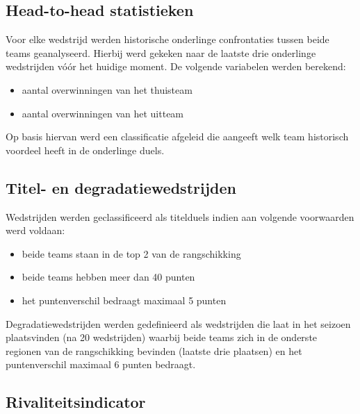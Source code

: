 \vspace{5pt}

\subsection{Head-to-head statistieken}

Voor elke wedstrijd werden historische onderlinge confrontaties tussen beide teams geanalyseerd. 
Hierbij werd gekeken naar de laatste drie onderlinge wedstrijden vóór het huidige moment. De volgende variabelen werden berekend:

\begin{itemize}
    \item aantal overwinningen van het thuisteam
    \item aantal overwinningen van het uitteam
\end{itemize}

Op basis hiervan werd een classificatie afgeleid die aangeeft welk team historisch voordeel heeft in de onderlinge duels.

\vspace{5pt}

\subsection{Titel- en degradatiewedstrijden}

Wedstrijden werden geclassificeerd als titelduels indien aan volgende voorwaarden werd voldaan:
\begin{itemize}
    \item beide teams staan in de top 2 van de rangschikking
    \item beide teams hebben meer dan 40 punten
    \item het puntenverschil bedraagt maximaal 5 punten
\end{itemize}

Degradatiewedstrijden werden gedefinieerd als wedstrijden die laat in het seizoen plaatsvinden (na 20 wedstrijden) waarbij 
beide teams zich in de onderste regionen van de rangschikking bevinden (laatste drie plaatsen) en het puntenverschil maximaal 6 punten bedraagt.

\vspace{5pt}

\subsection{Rivaliteitsindicator}

